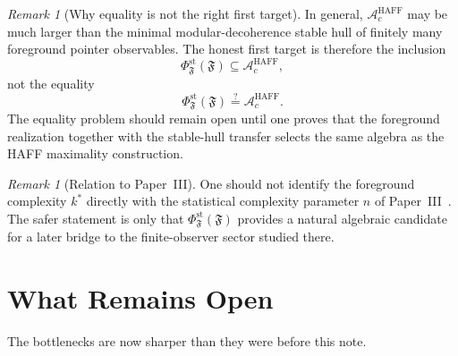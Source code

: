 \documentclass[12pt]{article}
\theoremstyle{definition}
\theoremstyle{remark}
\newtheorem{remark}[theorem]{Remark}
\begin{document}
\begin{remark}[Why equality is not the right first target]
In general, \(\mathcal A_c^{\mathrm{HAFF}}\) may be much larger than the
minimal modular-decoherence stable hull of finitely many foreground
pointer observables. The honest first target is therefore the inclusion
\[
\Phi_{\mathfrak F}^{\mathrm{st}}(\mathfrak F)\subseteq
\mathcal A_c^{\mathrm{HAFF}},
\]
not the equality
\[
\Phi_{\mathfrak F}^{\mathrm{st}}(\mathfrak F)\stackrel{?}{=}
\mathcal A_c^{\mathrm{HAFF}}.
\]
The equality problem should remain open until one proves that the
foreground realization together with the stable-hull transfer selects
the same algebra as the HAFF maximality construction.
\end{remark}

\begin{remark}[Relation to Paper~III]
One should not identify the foreground complexity \(k^*\) directly with
the statistical complexity parameter \(n\) of Paper~III~\cite{PaperIII}.
The safer statement is only that
\(\Phi_{\mathfrak F}^{\mathrm{st}}(\mathfrak F)\) provides a natural
algebraic candidate for a later bridge to the finite-observer sector
studied there.
\end{remark}

\section{What Remains Open}\label{sec:open}

The bottlenecks are now sharper than they were before this note.
\end{document}
